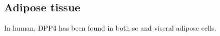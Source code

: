 \subsection{Adipose tissue}
In human, DPP4 has been found in both sc and viseral adipose cells.~\cite{Lamers2011}  